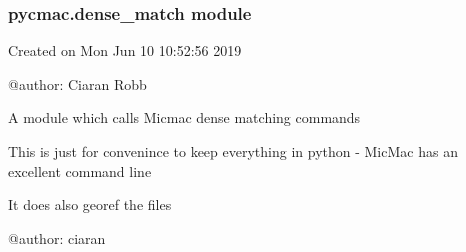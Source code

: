\documentclass[letterpaper,10pt,english]{sphinxmanual}
\begin{document}
\subsubsection{pycmac.dense\_match module}
\label{\detokenize{pycmac:module-dense_match}}\label{\detokenize{pycmac:pycmac-dense-match-module}}
Created on Mon Jun 10 10:52:56 2019

@author: Ciaran Robb

A module which calls Micmac dense matching commands

This is just for convenince  to keep everything in python - MicMac has an
excellent command line

It does also georef the files


@author: ciaran
\end{document}
